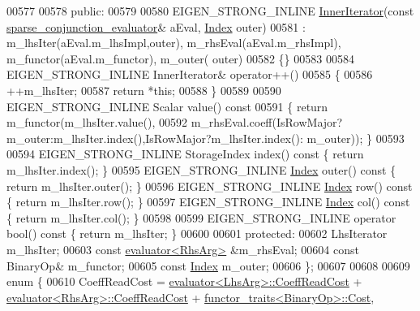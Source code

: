 \begin{DoxyCode}
00577 
00578   \textcolor{keyword}{public}:
00579     
00580     EIGEN\_STRONG\_INLINE \hyperlink{class_eigen_1_1_inner_iterator}{InnerIterator}(\textcolor{keyword}{const} 
      \hyperlink{struct_eigen_1_1internal_1_1sparse__conjunction__evaluator}{sparse\_conjunction\_evaluator}& aEval, \hyperlink{namespace_eigen_a62e77e0933482dafde8fe197d9a2cfde}{Index} outer)
00581       : m\_lhsIter(aEval.m\_lhsImpl,outer), m\_rhsEval(aEval.m\_rhsImpl), m\_functor(aEval.m\_functor), m\_outer(
      outer)
00582     \{\}
00583 
00584     EIGEN\_STRONG\_INLINE InnerIterator& operator++()
00585     \{
00586       ++m\_lhsIter;
00587       \textcolor{keywordflow}{return} *\textcolor{keyword}{this};
00588     \}
00589 
00590     EIGEN\_STRONG\_INLINE Scalar value()\textcolor{keyword}{ const}
00591 \textcolor{keyword}{    }\{ \textcolor{keywordflow}{return} m\_functor(m\_lhsIter.value(),
00592                        m\_rhsEval.coeff(IsRowMajor?m\_outer:m\_lhsIter.index(),IsRowMajor?m\_lhsIter.index():
      m\_outer)); \}
00593 
00594     EIGEN\_STRONG\_INLINE StorageIndex index()\textcolor{keyword}{ const }\{ \textcolor{keywordflow}{return} m\_lhsIter.index(); \}
00595     EIGEN\_STRONG\_INLINE \hyperlink{namespace_eigen_a62e77e0933482dafde8fe197d9a2cfde}{Index} outer()\textcolor{keyword}{ const }\{ \textcolor{keywordflow}{return} m\_lhsIter.outer(); \}
00596     EIGEN\_STRONG\_INLINE \hyperlink{namespace_eigen_a62e77e0933482dafde8fe197d9a2cfde}{Index} row()\textcolor{keyword}{ const }\{ \textcolor{keywordflow}{return} m\_lhsIter.row(); \}
00597     EIGEN\_STRONG\_INLINE \hyperlink{namespace_eigen_a62e77e0933482dafde8fe197d9a2cfde}{Index} col()\textcolor{keyword}{ const }\{ \textcolor{keywordflow}{return} m\_lhsIter.col(); \}
00598 
00599     EIGEN\_STRONG\_INLINE \textcolor{keyword}{operator} bool()\textcolor{keyword}{ const }\{ \textcolor{keywordflow}{return} m\_lhsIter; \}
00600     
00601   \textcolor{keyword}{protected}:
00602     LhsIterator m\_lhsIter;
00603     \textcolor{keyword}{const} \hyperlink{struct_eigen_1_1internal_1_1evaluator}{evaluator<RhsArg>} &m\_rhsEval;
00604     \textcolor{keyword}{const} BinaryOp& m\_functor;
00605     \textcolor{keyword}{const} \hyperlink{namespace_eigen_a62e77e0933482dafde8fe197d9a2cfde}{Index} m\_outer;
00606   \};
00607   
00608   
00609   \textcolor{keyword}{enum} \{
00610     CoeffReadCost = \hyperlink{struct_eigen_1_1internal_1_1evaluator}{evaluator<LhsArg>::CoeffReadCost} + 
      \hyperlink{struct_eigen_1_1internal_1_1evaluator}{evaluator<RhsArg>::CoeffReadCost} + 
      \hyperlink{struct_eigen_1_1internal_1_1functor__traits}{functor\_traits<BinaryOp>::Cost},

\end{DoxyCode}
